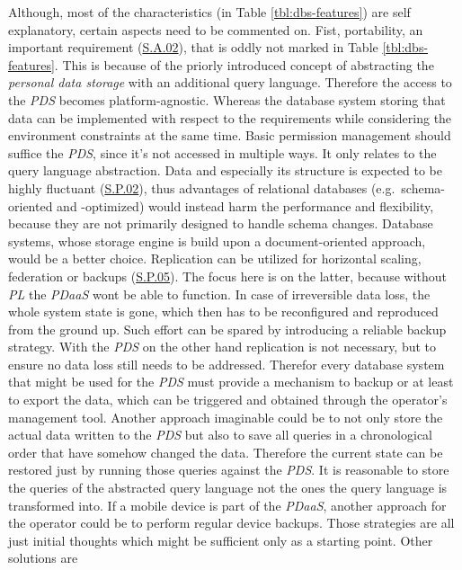 \documentclass[12pt,english,a4paper,titlepage,cleardoublepage=empty,dottedtoc]{report}
\begin{document}
Although, most of the characteristics (in Table \ref{tbl:dbs-features})
are self explanatory, certain aspects need to be commented on. Fist,
portability, an important requirement
(\protect\hyperlink{sa02}{S.A.02}), that is oddly not marked in Table
\ref{tbl:dbs-features}. This is because of the priorly introduced
concept of abstracting the \emph{personal data storage} with an
additional query language. Therefore the access to the \emph{PDS}
becomes platform-agnostic. Whereas the database system storing that data
can be implemented with respect to the requirements while considering
the environment constraints at the same time. Basic permission
management should suffice the \emph{PDS}, since it's not accessed in
multiple ways. It only relates to the query language abstraction. Data
and especially its structure is expected to be highly fluctuant
(\protect\hyperlink{sp02}{S.P.02}), thus advantages of relational
databases (e.g.~schema-oriented and -optimized) would instead harm the
performance and flexibility, because they are not primarily designed to
handle schema changes. Database systems, whose storage engine is build
upon a document-oriented approach, would be a better choice. Replication
can be utilized for horizontal scaling, federation or backups
(\protect\hyperlink{sp05}{S.P.05}). The focus here is on the latter,
because without \emph{PL} the \emph{PDaaS} wont be able to function. In
case of irreversible data loss, the whole system state is gone, which
then has to be reconfigured and reproduced from the ground up. Such
effort can be spared by introducing a reliable backup strategy. With the
\emph{PDS} on the other hand replication is not necessary, but to ensure
no data loss still needs to be addressed. Therefor every database system
that might be used for the \emph{PDS} must provide a mechanism to backup
or at least to export the data, which can be triggered and obtained
through the operator's management tool. Another approach imaginable
could be to not only store the actual data written to the \emph{PDS} but
also to save all queries in a chronological order that have somehow
changed the data. Therefore the current state can be restored just by
running those queries against the \emph{PDS}. It is reasonable to store
the queries of the abstracted query language not the ones the query
language is transformed into. If a mobile device is part of the
\emph{PDaaS}, another approach for the operator could be to perform
regular device backups. Those strategies are all just initial thoughts
which might be sufficient only as a starting point. Other solutions are
\end{document}
